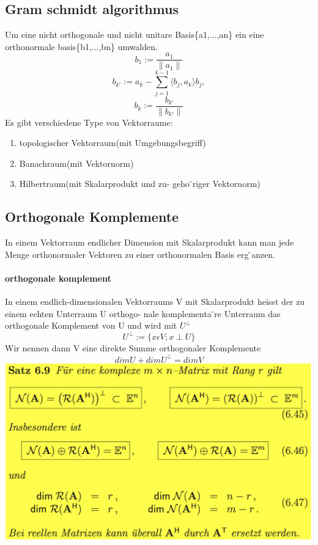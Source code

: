 \documentclass[11pt]{article}
\newcommand\back[1][-3cm]{\hspace*{#1}}
\begin{document}
\subsection{Gram schmidt algorithmus}
Um eine nicht orthogonale und nicht unitare Basis\{a1,...,an\} ein eine orthonormale basis\{b1,...,bn\} umwalden.
\begin{equation}
	b_1 := \frac{a_1}{\parallel a_1 \parallel}
\end{equation}
\begin{equation}
	b_{k'} := a_k-\sum_{j=1}^{k-1}\langle b_j,a_k\rangle b_j,
\end{equation}
\begin{equation}
	b_k := \frac{b_{k'}}{\parallel b_{k'}\parallel}
\end{equation}
Es gibt verschiedene Type von Vektorraume:
\begin{enumerate}
	\item topologischer Vektorraum(mit Umgebungsbegriff)
	\item Banachraum(mit Vektornorm)
	\item Hilbertraum(mit Skalarprodukt und zu-
geho ̈riger Vektornorm)
\end{enumerate}
\subsection{Orthogonale Komplemente}
In einem Vektorraum endlicher Dimension mit Skalarprodukt kann man jede Menge orthonormaler Vektoren zu einer orthonormalen Basis erg ̈anzen.
\paragraph{orthogonale komplement}
In einem endlich-dimensionalen Vektorraums V mit Skalarprodukt heisst der zu einem echten Unterraum U orthogo- nale komplementa ̈re Unterraum das orthogonale Komplement von U und wird mit $U^{\perp}$
\begin{equation}
	U^{\perp} := \{x\epsilon V; x \perp U\}
\end{equation}
Wir nennen dann V eine direkte Summe orthogonaler Komplemente
\begin{equation}
	dim U + dim U^{\perp} = dim V
\end{equation}
\back\includegraphics{images/komplexe}
\end{document}
